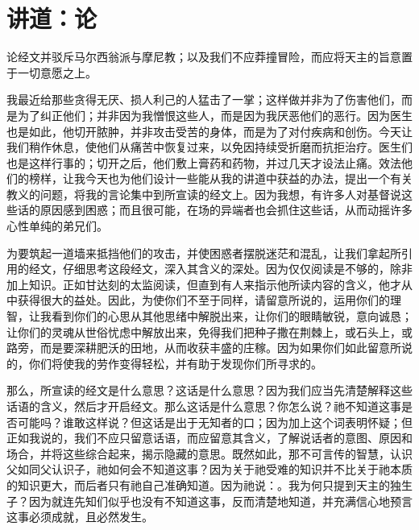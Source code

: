 
\chapter{讲道：论}


\par

论经文并驳斥马尔西翁派与摩尼教；以及我们不应莽撞冒险，而应将天主的旨意置于一切意愿之上。\par

我最近给那些贪得无厌、损人利己的人猛击了一掌；这样做并非为了伤害他们，而是为了纠正他们；并非因为我憎恨这些人，而是因为我厌恶他们的恶行。因为医生也是如此，他切开脓肿，并非攻击受苦的身体，而是为了对付疾病和创伤。今天让我们稍作休息，使他们从痛苦中恢复过来，以免因持续受折磨而抗拒治疗。医生们也是这样行事的；切开之后，他们敷上膏药和药物，并过几天才设法止痛。效法他们的榜样，让我今天也为他们设计一些能从我的讲道中获益的办法，提出一个有关教义的问题，将我的言论集中到所宣读的经文上。因为我想，有许多人对基督说这些话的原因感到困惑；而且很可能，在场的异端者也会抓住这些话，从而动摇许多心性单纯的弟兄们。\par

为要筑起一道墙来抵挡他们的攻击，并使困惑者摆脱迷茫和混乱，让我们拿起所引用的经文，仔细思考这段经文，深入其含义的深处。因为仅仅阅读是不够的，除非加上知识。正如甘达刻的太监阅读，但直到有人来指示他所读内容的含义，他才从中获得很大的益处。因此，为使你们不至于同样，请留意所说的，运用你们的理智，让我看到你们的心思从其他思绪中解脱出来，让你们的眼睛敏锐，意向诚恳；让你们的灵魂从世俗忧虑中解放出来，免得我们把种子撒在荆棘上，或石头上，或路旁，而是要深耕肥沃的田地，从而收获丰盛的庄稼。因为如果你们如此留意所说的，你们将使我的劳作变得轻松，并有助于发现你们所寻求的。\par

那么，所宣读的经文是什么意思？这话是什么意思？因为我们应当先清楚解释这些话语的含义，然后才开启经文。那么这话是什么意思？你怎么说？祂不知道这事是否可能吗？谁敢这样说？但这话是出于无知者的口；因为加上这个词表明怀疑；但正如我说的，我们不应只留意话语，而应留意其含义，了解说话者的意图、原因和场合，并将这些综合起来，揭示隐藏的意思。既然如此，那不可言传的智慧，认识父如同父认识子，祂如何会不知道这事？因为关于祂受难的知识并不比关于祂本质的知识更大，而后者只有祂自己准确知道。因为祂说：。我为何只提到天主的独生子？因为就连先知们似乎也没有不知道这事，反而清楚地知道，并充满信心地预言这事必须成就，且必然发生。\par

